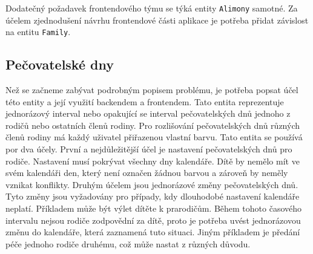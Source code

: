         Dodatečný požadavek frontendového týmu se týká entity \texttt{Alimony} samotné. Za účelem zjednodušení návrhu frontendové části aplikace je potřeba přidat závislost na entitu \texttt{Family}. %
        
    \subsection{Pečovatelské dny}\label{analyza:pozadavky:caredays}
        Než se začneme zabývat podrobným popisem problému, je potřeba popsat účel této entity a její využití backendem a frontendem. Tato entita reprezentuje jednorázový interval nebo opakující se interval pečovatelských dnů jednoho z rodičů nebo ostatních členů rodiny. Pro rozlišování pečovatelských dnů různých členů rodiny má každý uživatel přiřazenou vlastní barvu. Tato entita se používá por dva účely. První a nejdůležitější účel je nastavení pečovatelských dnů pro rodiče. Nastavení musí pokrývat všechny dny kalendáře. Dítě by nemělo mít ve svém kalendáři den, který není označen žádnou barvou a zároveň by neměly vznikat konflikty. Druhým účelem jsou jednorázové změny pečovatelských dnů. Tyto změny jsou vyžadovány pro případy, kdy dlouhodobé nastavení kalendáře neplatí. Příkladem může být výlet dítěte k prarodičům. Během tohoto časového intervalu nejsou rodiče zodpovědní za dítě, proto je potřeba uvést jednorázovou změnu do kalendáře, která zaznamená tuto situaci. Jiným příkladem je předání péče jednoho rodiče druhému, což může nastat z různých důvodu.

